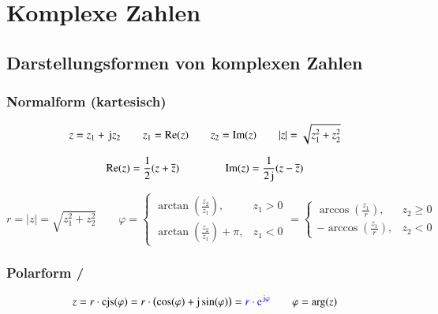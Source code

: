 \section{Komplexe Zahlen}

\subsection{Darstellungsformen von komplexen Zahlen}

\subsubsection{Normalform (kartesisch)}

\vspace{-0.2cm}

$$ z = z_1 + \, \mathop{} \! \mathrm{j} z_2 \qquad z_1 = \mathop{} \! \mathrm{Re}(z) \qquad z_2 = \mathop{} \! \mathrm{Im}(z) \qquad \vert z \vert = \sqrt{z_1^2 + z_2^2} $$
\vspace{-2em}

$$ \mathop{} \! \mathrm{Re}(z) = \frac{1}{2}(z+\overline{z}) \qquad \qquad \mathop{} \! \mathrm{Im}(z) = \frac{1}{2\mathop{} \! \mathrm{j}}(z - \overline{z})$$


\vspace{-0.2cm}

$$ r =  \vert z \vert = \sqrt{z_1^2 + z_2^2} \qquad
    \varphi = \begin{cases}
        \arctan\left(\frac{z_2}{z_1}\right),       & z_1 > 0 \\
        \arctan\left(\frac{z_2}{z_1}\right) + \pi, & z_1 < 0
    \end{cases} = \begin{cases}
        \arccos\left(\frac{z_1}{r}\right),  & z_2 \geq 0 \\
        -\arccos\left(\frac{z_1}{r}\right), & z_2 < 0
    \end{cases}$$


\subsubsection{Polarform / }

\vspace{-0.2cm}

$$ z = r \cdot \cjs(\varphi) = r \cdot \left(\cos(\varphi) + \jimg \sin(\varphi)\right) = \cbl{r \cdot \e^{ \jimg \varphi}} \qquad \varphi = \arg(z) $$


\vspace{-0.2cm}

